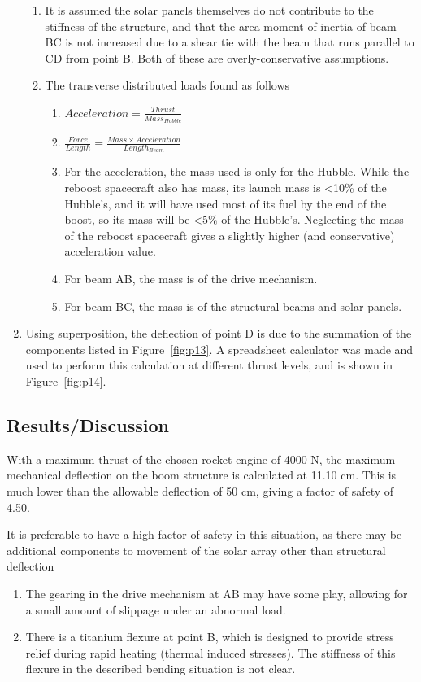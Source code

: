 \documentclass[paper=letter, fontsize=11pt]{scrartcl} %
\numberwithin{equation}{section} %
\numberwithin{figure}{section} %
\numberwithin{table}{section} %
\begin{document}
\begin{enumerate}
\begin{enumerate}
            \item It is assumed the solar panels themselves do not contribute to the stiffness of the structure, and that the area moment of inertia of beam BC is not increased due to a shear tie with the beam that runs parallel to CD from point B. Both of these are overly-conservative assumptions.
            \item The transverse distributed loads found as follows
                  \begin{enumerate}
                    \item $Acceleration = \frac{Thrust}{Mass_{Hubble}}$
                    \item $\frac{Force}{Length} = \frac{Mass \times Acceleration}{Length_{Beam}}$
                    \item For the acceleration, the mass used is only for the Hubble. While the reboost spacecraft also has mass, its launch mass is \textless 10\% of the Hubble's, and it will have used most of its fuel by the end of the boost, so its mass will be \textless 5\% of the Hubble's. Neglecting the mass of the reboost spacecraft gives a slightly higher (and conservative) acceleration value.
                    \item For beam AB, the mass is of the drive mechanism.
                    \item For beam BC, the mass is of the structural beams and solar panels.
                  \end{enumerate}
          \end{enumerate}
    \item Using superposition, the deflection of point D is due to the summation of the components listed in Figure~\ref{fig:p13}. A spreadsheet calculator was made and used to perform this calculation at different thrust levels, and is shown in Figure~\ref{fig:p14}.
\end{enumerate}

\subsection{Results/Discussion}
With a maximum thrust of the chosen rocket engine of 4000 N, the maximum mechanical deflection on the boom structure is calculated at 11.10 cm. This is much lower than the allowable deflection of 50 cm, giving a factor of safety of 4.50.

It is preferable to have a high factor of safety in this situation, as there may be additional components to movement of the solar array other than structural deflection
\begin{enumerate}
    \item The gearing in the drive mechanism at AB may have some play, allowing for a small amount of slippage under an abnormal load.
    \item There is a titanium flexure at point B, which is designed to provide stress relief during rapid heating (thermal induced stresses). The stiffness of this flexure in the described bending situation is not clear.
\end{enumerate}
\end{document}
